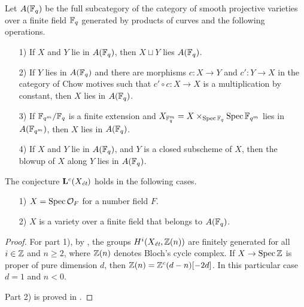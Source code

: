 \documentclass{article}
\numberwithin{equation}{section}
\begin{document}
\begin{definition}
  Let $A (\FF_q)$ be the full subcategory of the category of smooth projective
  varieties over a finite field $\FF_q$ generated by products of curves and the
  following operations.
  \begin{enumerate}
  \item[1)] If $X$ and $Y$ lie in $A (\FF_q)$, then $X \sqcup Y$ lies
    $A (\FF_q)$.
  \item[2)] If $Y$ lies in $A (\FF_q)$ and there are morphisms $c\colon X\to Y$
    and $c'\colon Y\to X$ in the category of Chow motives such that
    $c'\circ c\colon X\to X$ is a multiplication by constant, then
    $X$ lies in $A (\FF_q)$.
  \item[3)] If $\FF_{q^m}/\FF_q$ is a finite extension and
    $X_{\FF_q^m} = X \times_{\Spec \FF_q} \Spec \FF_{q^m}$ lies in
    $A (\FF_{q^m})$, then $X$ lies in $A (\FF_q)$.
  \item[4)] If $X$ and $Y$ lie in $A (\FF_q)$, and $Y$ is a closed subscheme of
    $X$, then the blowup of $X$ along $Y$ lies in $A (\FF_q)$.
  \end{enumerate}
\end{definition}

\begin{lemma}
  \label{lemma:Lc(Xet)-holds-for-OF-and-A(Fq)}
  The conjecture $\mathbf{L}^c (X_\et)$ holds in the following cases.

  \begin{enumerate}
  \item[1)] $X = \Spec \mathcal{O}_F$ for a number field $F$.

  \item[2)] $X$ is a variety over a finite field that belongs to $A (\FF_q)$.
  \end{enumerate}

  \begin{proof}
    For part 1), by \cite[Theorem~5.1~(b)]{Morin-2014}, the groups
    $H^i (X_\et, \ZZ(n))$ are finitely generated for all $i \in \ZZ$ and
    $n \ge 2$, where $\ZZ (n)$ denotes Bloch's cycle complex. If
    $X \to \Spec \ZZ$ is proper of pure dimension $d$, then
    $\ZZ (n) = \ZZ^c (d-n) [-2d]$. In this particular case $d = 1$ and $n < 0$.

    Part 2) is proved in \cite[Proposition~5.7]{Morin-2014}.
  \end{proof}
\end{lemma}
\end{document}
